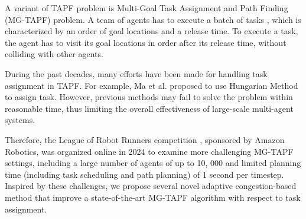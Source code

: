 \documentclass[letterpaper]{article} %
\begin{document}
A variant of TAPF problem is Multi-Goal Task Assignment and Path Finding (MG-TAPF) problem.  
A team of agents has to execute a batch of tasks \cite{ma2017lifelong},  
which is characterized by an order of goal locations and a release time. 
To execute a task, the agent has to visit its goal locations in order after its release time, without colliding with other agents. 



During the past decades, many efforts have been made for handling task assignment in TAPF. 
For example, Ma et al. \cite{ma2017lifelong} proposed to use Hungarian Method \cite{kuhn1955hungarian} to assign task. 
However, previous methods may fail to solve the problem within reasonable time, thus limiting the overall effectiveness of large-scale multi-agent systems. 

Therefore, the League of Robot Runners competition \cite{chen2024lorr}, sponsored by Amazon Robotics, was organized online in 2024 to examine more challenging MG-TAPF settings, including 
a large number of agents of up to 10, 000 
and limited planning time (including task scheduling and path planning) of 1 second per timestep. 
Inspired by these challenges, we propose several novel adaptive congestion-based method that improve a state-of-the-art MG-TAPF algorithm with respect to task assignment. 
\end{document}
